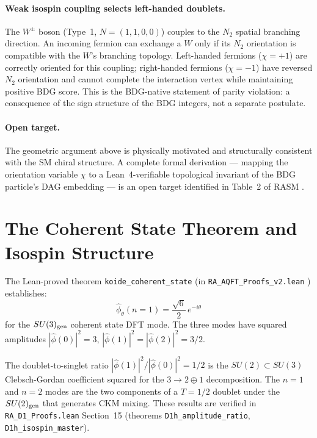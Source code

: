 \documentclass[11pt,a4paper]{article}
\begin{document}
\paragraph{Weak isospin coupling selects left-handed doublets.}
The $W^\pm$ boson (Type~1, $N=(1,1,0,0)$) couples to the $N_2$ spatial branching direction.
An incoming fermion can exchange a $W$ only if its $N_2$ orientation is compatible with the
$W$'s branching topology.  Left-handed fermions ($\chi=+1$) are correctly oriented for this
coupling; right-handed fermions ($\chi=-1$) have reversed $N_2$ orientation and cannot
complete the interaction vertex while maintaining positive BDG score.  This is the BDG-native
statement of parity violation: a consequence of the sign structure of the BDG integers, not a
separate postulate.

\paragraph{Open target.}
The geometric argument above is physically motivated and structurally consistent with the SM
chiral structure.  A complete formal derivation --- mapping the orientation variable $\chi$ to a
Lean~4-verifiable topological invariant of the BDG particle's DAG embedding --- is an open
target identified in Table~2 of RASM \citep{Sandeman2026RASM}.

\section{The Coherent State Theorem and Isospin Structure}

The Lean-proved theorem \texttt{koide\_coherent\_state}
(in \texttt{RA\_AQFT\_Proofs\_v2.lean} \citep{Meiburg2025}) establishes:
\[
\hat\phi_\theta(n=1) = \frac{\sqrt{6}}{2}\,e^{-i\theta}
\]
for the $SU(3)_{\rm gen}$ coherent state DFT mode.  The three modes have squared amplitudes
$|\hat\phi(0)|^2 = 3$, $|\hat\phi(1)|^2 = |\hat\phi(2)|^2 = 3/2$.

The doublet-to-singlet ratio $|\hat\phi(1)|^2/|\hat\phi(0)|^2 = 1/2$ is the $SU(2)\subset SU(3)$
Clebsch-Gordan coefficient squared for the $3\to2\oplus1$ decomposition.  The $n=1$ and $n=2$
modes are the two components of a $T=1/2$ doublet under the $SU(2)_{\rm gen}$ that generates
CKM mixing.  These results are verified in \texttt{RA\_D1\_Proofs.lean} Section~15 (theorems
\texttt{D1h\_amplitude\_ratio}, \texttt{D1h\_isospin\_master}).
\end{document}
